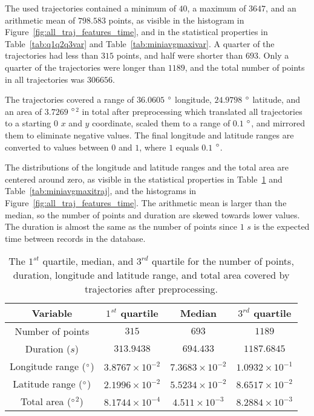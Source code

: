 \documentclass[preprint,12pt]{elsarticle}
\begin{document}
The used trajectories contained a minimum of $40$, a maximum of $3647$, and an arithmetic mean of $798.583$ points, as visible in the histogram in Figure~\ref{fig:all_traj_features_time}, and in the statistical properties in Table~\ref{tab:q1q2q3var} and Table~\ref{tab:miniavgmaxivar}. A quarter of the trajectories had less than $315$ points, and half were shorter than $693$. Only a quarter of the trajectories were longer than $1189$, and the total number of points in all trajectories was $306656$.

The trajectories covered a range of $36.0605$ $\degree$ longitude, $24.9798$ $\degree$ latitude, and an area of $3.7269$ $\degree$$^{2}$ in total after preprocessing which translated all trajectories to a starting $0$ $x$ and $y$ coordinate, scaled them to a range of $0.1$ $\degree$, and mirrored them to eliminate negative values. The final longitude and latitude ranges are converted to values between $0$ and $1$, where $1$ equals $0.1$ $\degree$.

The distributions of the longitude and latitude ranges and the total area are centered around zero, as visible in the statistical properties in Table~\ref{tab:q1q2q3traj} and Table~\ref{tab:miniavgmaxitraj}, and the histograms in Figure~\ref{fig:all_traj_features_time}. The arithmetic mean is larger than the median, so the number of points and duration are skewed towards lower values. The duration is almost the same as the number of points since $1$ $s$ is the expected time between records in the database.

\begin{table}[!ht]
    \centering
    \begin{tabular}{|c|c|c|c|} 
        \hline
        Variable & $1^{st}$ quartile & Median & $3^{rd}$ quartile \\ \hline
        Number of points & $315$ & $693$ & $1189$ \\ \hline
        Duration ($s$) & $313.9438$ & $694.433$ & $1187.6845$ \\ \hline
        Longitude range ($\degree$) & $3.8767 \times 10^{-2}$ & $7.3683 \times 10^{-2}$ & $1.0932 \times 10^{-1}$ \\ \hline
        Latitude range ($\degree$) & $2.1996 \times 10^{-2}$ & $5.5234 \times 10^{-2}$ & $8.6517 \times 10^{-2}$ \\ \hline
        Total area ($\degree$$^{2}$) & $8.1744 \times 10^{-4}$ & $4.511 \times 10^{-3}$ & $8.2884 \times 10^{-3}$ \\ \hline
    \end{tabular}
    \caption{The $1^{st}$ quartile, median, and $3^{rd}$ quartile for the number of points, duration, longitude and latitude range, and total area covered by trajectories after preprocessing.}
    \label{tab:q1q2q3traj}
\end{table}
\end{document}
